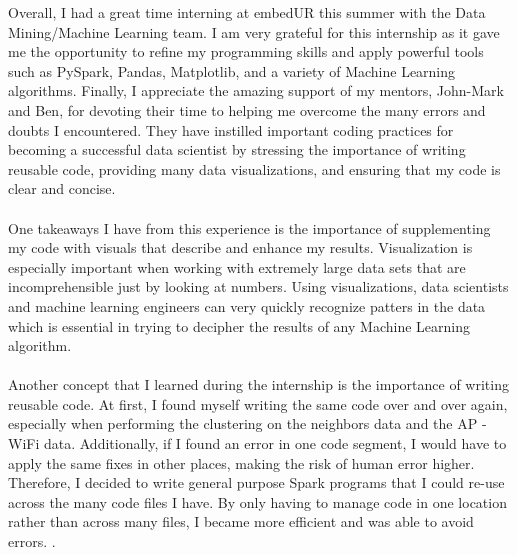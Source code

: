 \documentclass{article}
\begin{document}
Overall, I had a great time interning at embedUR this summer with the Data Mining/Machine Learning team. I am very grateful for this internship as it gave me the opportunity to refine my programming skills and apply powerful tools such as PySpark, Pandas, Matplotlib, and a variety of Machine Learning algorithms. Finally, I appreciate the amazing support of my mentors, John-Mark and Ben, for devoting their time to helping me overcome the many errors and doubts I encountered. They have instilled important coding practices for becoming a successful data scientist by stressing the importance of writing reusable code, providing many data visualizations, and ensuring that my code is clear and concise. 
\\ \\
One takeaways I have from this experience is the importance of supplementing my code with visuals that describe and enhance my results. Visualization is especially important when working with extremely large data sets that are incomprehensible just by looking at numbers. Using visualizations, data scientists and machine learning engineers can very quickly recognize patters in the data which is essential in trying to decipher the results of any Machine Learning algorithm. 
\\ \\
Another concept that I learned during the internship is the importance of writing reusable code. At first, I found myself writing the same code over and over again, especially when performing the clustering on the neighbors data and the AP - WiFi data. Additionally, if I found an error in one code segment, I would have to apply the same fixes in other places, making the risk of human error higher. Therefore, I decided to write general purpose Spark programs that I could re-use across the many code files I have. By only having to manage code in one location rather than across many files, I became more efficient and was able to avoid errors.
.  
\end{document}
